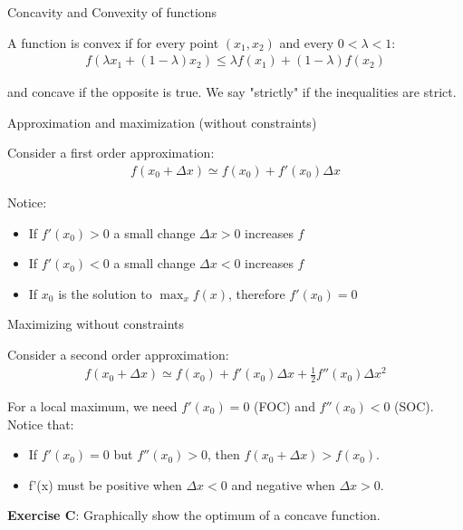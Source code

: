 \documentclass[handout]{beamer}
\begin{document}
\begin{frame}{Concavity and Convexity of functions}

A function is convex if for every point $(x_1,x_2)$ and every $0<\lambda<1$: 
\begin{align*}
f(\lambda x_1 + (1-\lambda) x_2) \leq \lambda f(x_1) + (1-\lambda)f(x_2)
\end{align*}

and concave if the opposite is true. We say "strictly" if the inequalities are strict. 

\end{frame}



\begin{frame}{Approximation and maximization (without constraints)}

Consider a first order approximation:
\begin{eqnarray}
 f(x_0+\Delta x) \simeq f(x_0)+ f'(x_0)\Delta x 
\end{eqnarray}

Notice:
\begin{itemize}
\item If $f'(x_0)>0$  a small change $\Delta x>0$ increases $f$
\item If $f'(x_0) <0$ a small change $\Delta x <0$ increases $f$
\item If $x_0$  is the solution to  $\max_x f(x)$, therefore $f'(x_0) =0$
\end{itemize} 
\end{frame}

\begin{frame}{Maximizing without constraints}

Consider a second order approximation:
\begin{eqnarray}
 f(x_0+\Delta x) \simeq f(x_0) + f'(x_0)\Delta x +\frac{1}{2}f''(x_0)\Delta x ^2  
\end{eqnarray}

For a local maximum, we need $f'(x_0)=0$ (FOC) and $f''(x_0)<0$ (SOC). 
Notice that:
\begin{itemize}
\item If $f'(x_0) = 0$ but $f''(x_0)>0$, then $f(x_0+\Delta x) > f(x_0)$. 
\item f'(x) must be positive when $\Delta x <0$ and negative when $\Delta x>0$. 
\end{itemize}

\textbf{Exercise C}: Graphically show the optimum of a concave function.
\end{frame}
\end{document}
